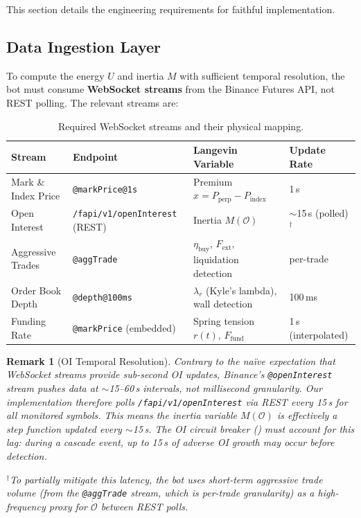 \documentclass[11pt,a4paper]{article}
\newtheorem{remark}{Remark}[section]
\newcommand{\Fext}{F_{\mathrm{ext}}}
\newcommand{\Ffund}{F_{\mathrm{fund}}}
\newcommand{\OI}{\mathcal{O}}
\begin{document}
This section details the engineering requirements for faithful implementation.


\subsection{Data Ingestion Layer}

To compute the energy $U$ and inertia $M$ with sufficient temporal resolution, 
the bot must consume \textbf{WebSocket streams} from the Binance Futures API, 
not REST polling. The relevant streams are:

\begin{table}[H]
\centering
\caption{Required WebSocket streams and their physical mapping.}
\label{tab:streams}
\renewcommand{\arraystretch}{1.3}
\begin{tabularx}{\textwidth}{llXl}
\toprule
Stream & Endpoint & Langevin Variable & Update Rate \\
\midrule
Mark \& Index Price & \texttt{@markPrice@1s} & 
    Premium $x = P_{\mathrm{perp}} - P_{\mathrm{index}}$ & 1\,s \\
Open Interest & \texttt{/fapi/v1/openInterest} (REST) & 
    Inertia $M(\OI)$ & $\sim$15\,s (polled)$^\dagger$ \\
Aggressive Trades & \texttt{@aggTrade} & 
    $\eta_{\mathrm{buy}}$, $\Fext$, liquidation detection & per-trade \\
Order Book Depth & \texttt{@depth@100ms} & 
    $\lambda_r$ (Kyle's lambda), wall detection & 100\,ms \\
Funding Rate & \texttt{@markPrice} (embedded) & 
    Spring tension $r(t)$, $\Ffund$ & 1\,s (interpolated) \\
\bottomrule
\end{tabularx}
\end{table}

\begin{remark}[OI Temporal Resolution]
\label{rem:oi_resolution}
Contrary to the na\"ive expectation that WebSocket streams provide 
sub-second OI updates, Binance's \texttt{@openInterest} stream pushes data 
at $\sim$15--60\,s intervals, not millisecond granularity. Our implementation 
therefore polls \texttt{/fapi/v1/openInterest} via REST every 15\,s for all 
monitored symbols. This means the inertia variable $M(\OI)$ is effectively a 
\emph{step function} updated every $\sim$15\,s. The OI circuit breaker 
() must account for this lag: during a cascade event, up to 
15\,s of adverse OI growth may occur before detection.

\noindent $^\dagger$To partially mitigate this latency, the bot uses 
short-term aggressive trade volume (from the \texttt{@aggTrade} stream, which 
\emph{is} per-trade granularity) as a high-frequency proxy for $\dot{\OI}$ 
between REST polls.
\end{remark}
\end{document}
